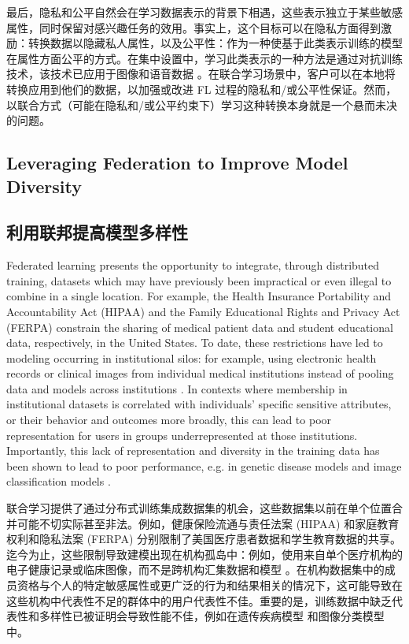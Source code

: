 最后，隐私和公平自然会在学习数据表示的背景下相遇，这些表示独立于某些敏感属性，同时保留对感兴趣任务的效用。事实上，这个目标可以在隐私方面得到激励：转换数据以隐藏私人属性，以及公平性：作为一种使基于此类表示训练的模型在属性方面公平的方式。在集中设置中，学习此类表示的一种方法是通过对抗训练技术，该技术已应用于图像和语音数据 \citep{kairouz20learning,DBLP:journals/corr/abs-1802-09386,Madras2018,Bertran2019,Srivastava2019a}。在联合学习场景中，客户可以在本地将转换应用到他们的数据，以加强或改进 FL 过程的隐私和/或公平性保证。然而，以联合方式（可能在隐私和/或公平约束下）学习这种转换本身就是一个悬而未决的问题。


\subsection{Leveraging Federation to Improve Model Diversity }\label{subsec:diversity}
\subsection*{利用联邦提高模型多样性}

Federated learning presents the opportunity to integrate, through distributed training, datasets which may have previously been impractical or even illegal to combine in a single location. For example, the Health Insurance Portability and Accountability Act (HIPAA) and the Family Educational Rights and Privacy Act (FERPA) constrain the sharing of medical patient data and student educational data, respectively, in the United States. To date, these restrictions have led to modeling occurring in institutional silos: for example, using electronic health records or clinical images from individual medical institutions instead of pooling data and models across institutions \cite{brisimi2018federated, chang2018distributed}. In contexts where membership in institutional datasets is correlated with individuals' specific sensitive attributes, or their behavior and outcomes more broadly, this can lead to poor representation for users in groups underrepresented at those institutions. Importantly, this lack of representation and diversity in the training data has been shown to lead to poor performance, e.g. in genetic disease models \cite{martin2019current} and image classification models \cite{buolamwini2018gender}.

联合学习提供了通过分布式训练集成数据集的机会，这些数据集以前在单个位置合并可能不切实际甚至非法。例如，健康保险流通与责任法案 (HIPAA) 和家庭教育权利和隐私法案 (FERPA) 分别限制了美国医疗患者数据和学生教育数据的共享。迄今为止，这些限制导致建模出现在机构孤岛中：例如，使用来自单个医疗机构的电子健康记录或临床图像，而不是跨机构汇集数据和模型 \cite{brisimi2018federated, chang2018distributed}。在机构数据集中的成员资格与个人的特定敏感属性或更广泛的行为和结果相关的情况下，这可能导致在这些机构中代表性不足的群体中的用户代表性不佳。重要的是，训练数据中缺乏代表性和多样性已被证明会导致性能不佳，例如在遗传疾病模型 \cite{martin2019current} 和图像分类模型 \cite{buolamwini2018gender} 中。



